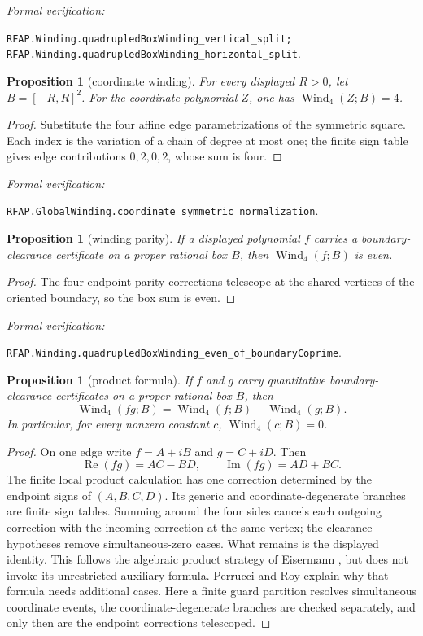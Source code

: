 \documentclass[11pt]{article}
\newtheorem{proposition}[theorem]{Proposition}
\newcommand{\Ree}{\operatorname{Re}}
\newcommand{\Imm}{\operatorname{Im}}
\newcommand{\Wind}{\operatorname{Wind}}
\newcommand{\leanref}[1]{\par\smallskip\noindent
  \emph{Formal verification:}\par\nobreak
  {\raggedright\nolinkurl{#1}.\par}}
\begin{document}
\leanref{RFAP.Winding.quadrupledBoxWinding_vertical_split;
RFAP.Winding.quadrupledBoxWinding_horizontal_split}

\begin{proposition}[coordinate winding]
\label{prop:coordinate-normalization}
For every displayed $R>0$, let $B=[-R,R]^2$.  For the coordinate polynomial
$Z$, one has $\Wind_4(Z;B)=4$.
\end{proposition}

\begin{proof}
Substitute the four affine edge parametrizations of the symmetric square.
Each index is the variation of a chain of degree at most one; the finite sign
table gives edge contributions $0,2,0,2$, whose sum is four.
\end{proof}

\leanref{RFAP.GlobalWinding.coordinate_symmetric_normalization}

\begin{proposition}[winding parity]
\label{prop:parity}
If a displayed polynomial $f$ carries a boundary-clearance certificate on a
proper rational box $B$, then $\Wind_4(f;B)$ is even.
\end{proposition}

\begin{proof}
The four endpoint parity corrections telescope at the shared vertices of
the oriented boundary, so the box sum is even.
\end{proof}

\leanref{RFAP.Winding.quadrupledBoxWinding_even_of_boundaryCoprime}

\begin{proposition}[product formula]
\label{prop:product}
If $f$ and $g$ carry quantitative boundary-clearance certificates on a
proper rational box $B$, then
\[
       \Wind_4(fg;B)=\Wind_4(f;B)+\Wind_4(g;B).
\]
In particular, for every nonzero constant $c$,
$\Wind_4(c;B)=0$.
\end{proposition}

\begin{proof}
On one edge write $f=A+iB$ and $g=C+iD$.  Then
\[
 \Ree(fg)=AC-BD,\qquad \Imm(fg)=AD+BC.
\]
The finite local product calculation has one correction determined by the
endpoint signs of $(A,B,C,D)$.  Its generic and coordinate-degenerate
branches are finite sign tables.  Summing around the four sides cancels each
outgoing correction with the incoming correction at the same vertex; the
clearance hypotheses remove simultaneous-zero cases.  What remains is the
displayed identity.  This follows the algebraic product strategy of
Eisermann \cite{Eisermann}, but does not invoke its unrestricted auxiliary
formula.  Perrucci and Roy \cite{PerrucciRoyWinding} explain why that formula
needs additional cases.  Here a finite guard partition resolves simultaneous
coordinate events, the coordinate-degenerate branches are checked
separately, and only then are the endpoint corrections telescoped.
\end{proof}
\end{document}
